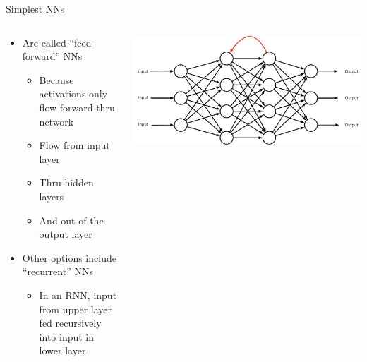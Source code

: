 \documentclass[aspectratio=169]{beamer}
\begin{document}
\begin{frame}{Simplest NNs}

\begin{columns}[b]
\begin{column}{0.6\textwidth}
\begin{itemize}
	\item Are called ``feed-forward'' NNs 
	\begin{itemize}
		\item Because activations only flow forward thru network
		\item Flow from input layer
		\item Thru hidden layers
		\item And out of the output layer
	\end{itemize}
	\item Other options include ``recurrent'' NNs
	\begin{itemize}
		\item In an RNN, input from upper layer fed recursively into input in lower layer
	\end{itemize}
\end{itemize}
\end{column}
\begin{column}{0.4\textwidth}
\includegraphics[width=1\textwidth]{lectFF/rnn.pdf}
\end{column}
\end{columns}
\end{frame}
\end{document}
